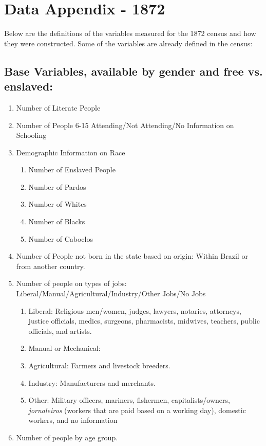 \documentclass[11pt]{article}
\begin{document}
\section{Data Appendix - 1872}
\label{app:variable_construction_1872}

Below are the definitions of the variables measured for the 1872 census and how they were constructed. Some of the variables are already defined in the census:

\subsection{Base Variables, available by gender and free vs. enslaved:}

\begin{enumerate}
  \item Number of Literate People
  \item Number of People 6-15 Attending/Not Attending/No Information on Schooling
  \item Demographic Information on Race
    \begin{enumerate}
      \item Number of Enslaved People
      \item Number of Pardos
      \item Number of Whites
      \item Number of Blacks
      \item Number of Caboclos
    \end{enumerate}
  \item Number of People not born in the state based on origin: Within Brazil or from another country.
  \item Number of people on types of jobs: Liberal/Manual/Agricultural/Industry/Other Jobs/No Jobs
    \begin{enumerate}
      \item Liberal: Religious men/women, judges, lawyers, notaries, attorneys, justice officials, medics, surgeons, pharmacists, midwives, teachers, public officials, and artists.
      \item Manual or Mechanical: 
      \item Agricultural: Farmers and livestock breeders.
      \item Industry: Manufacturers and merchants.
      \item Other: Military officers, mariners, fishermen, capitalists/owners, \textit{jornaleiros} (workers that are paid based on a working day), domestic workers, and no information
    \end{enumerate}
  \item Number of people by age group.
\end{enumerate}
\end{document}
